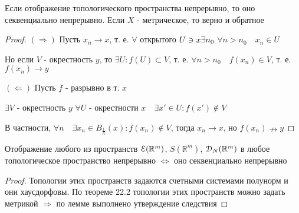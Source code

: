 \documentclass[a4paper,12pt]{report}
\begin{document}
\begin{lem}
Если отображение топологического пространства непрерывно, то оно секвенциально непрерывно. Если $X$ - метрическое, то верно и обратное
\end{lem}
\begin{proof}
$(\Rightarrow)$ Пусть $x_n\to x$, т. е. $\forall$  открытого $U\ni x\\ \exists n_0$ $\forall n>n_0\quad x_n\in U$

Но если $V$ - окрестность $y$, то $\exists U\colon f(U)\subset V$, т. е. $\forall n>n_0\quad f(x_n)\in V$, т. е. $f(x_n)\to y$

$(\Leftarrow)$ Пусть $f$ - разрывно в т. $x$

$\exists V$ - окрестность $y$ $\forall U$ - окрестности $x\quad\exists x'\in U\colon f(x')\notin V$

В частности, $\forall n\quad\exists x_n\in B_{\frac1n}(x)\colon f(x_n)\notin V$, тогда $x_n\to x$, но $f(x_n){\nrightarrow y}$
\end{proof}


\begin{cons}
Отображение любого из пространств $\EuScript E(\mathbb R^m)$, $S(\mathbb R^m)$, $\EuScript D_N(\mathbb R^m)$ в любое топологическое пространство непрерывно $\Leftrightarrow$ оно секвенциально непрерывно
\end{cons}
\begin{proof}
Топологии этих пространств задаются счетными системами полунорм и они хаусдорфовы. По теореме 22.2 топологии этих пространств можно задать метрикой $\Rightarrow$ по лемме выполнено утверждение следствия
\end{proof}
\end{document}
